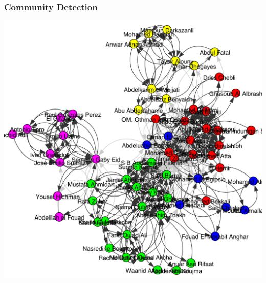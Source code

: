 \documentclass[hyperref={pdfpagelabels=false}]{beamer}
\begin{document}
\begin{frame}
\frametitle{Community Detection}
\centering
\includegraphics[scale=0.35]{images/community-partition.pdf}
\end{frame}

\end{document}
